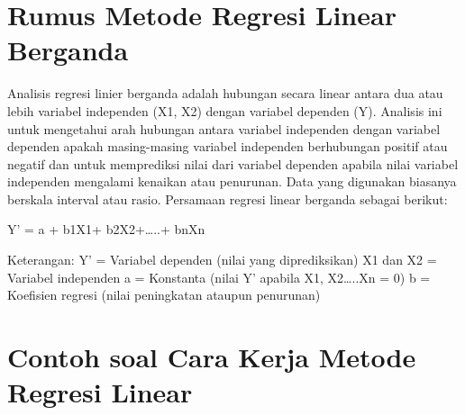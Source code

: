 \section{Rumus Metode Regresi Linear Berganda}

Analisis regresi linier berganda adalah hubungan secara linear antara dua atau lebih variabel independen (X1, X2) dengan variabel dependen (Y). Analisis ini untuk mengetahui arah hubungan antara variabel independen dengan variabel dependen apakah masing-masing variabel independen berhubungan positif atau negatif dan untuk memprediksi nilai dari variabel dependen apabila nilai variabel independen mengalami kenaikan atau penurunan. Data yang digunakan biasanya berskala interval atau rasio.\citep{smadi2012least}
                        Persamaan regresi linear berganda sebagai berikut:

Y’ = a + b1X1+ b2X2+…..+ bnXn

Keterangan:
Y’                    =   Variabel dependen (nilai yang diprediksikan)
X1 dan X2      =   Variabel independen
a                      =   Konstanta (nilai Y’ apabila X1, X2…..Xn = 0)
b                            =    Koefisien regresi (nilai peningkatan ataupun penurunan)

\newpage \section{Contoh soal Cara Kerja Metode Regresi Linear}

